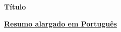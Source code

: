 \documentclass[10pt,a4paper]{report}
\begin{document}
	
\textbf{Título} 

\vspace{1.5cm}

\underline{\textbf{Resumo alargado em Português}}

\vspace{0.3cm}
\end{document}
